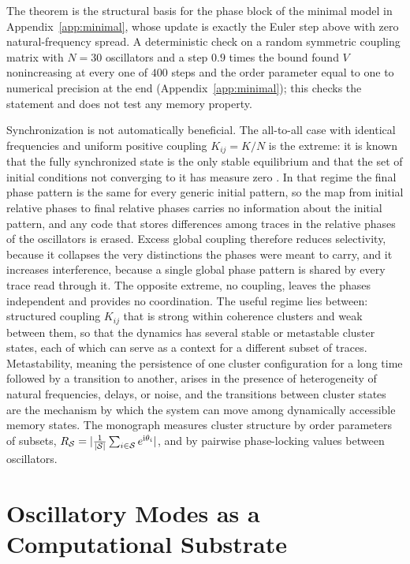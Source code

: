 The theorem is the structural basis for the phase block of the minimal model in Appendix~\ref{app:minimal}, whose update is exactly the Euler step above with zero natural-frequency spread. A deterministic check on a random symmetric coupling matrix with $N=30$ oscillators and a step $0.9$ times the bound found $V$ nonincreasing at every one of $400$ steps and the order parameter equal to one to numerical precision at the end (Appendix~\ref{app:minimal}); this checks the statement and does not test any memory property.

Synchronization is not automatically beneficial. The all-to-all case with identical frequencies and uniform positive coupling $K_{ij}=K/N$ is the extreme: it is known that the fully synchronized state is the only stable equilibrium and that the set of initial conditions not converging to it has measure zero \cite{kuramoto1984,strogatz2000,acebron2005,watanabe1994}. In that regime the final phase pattern is the same for every generic initial pattern, so the map from initial relative phases to final relative phases carries no information about the initial pattern, and any code that stores differences among traces in the relative phases of the oscillators is erased. Excess global coupling therefore reduces selectivity, because it collapses the very distinctions the phases were meant to carry, and it increases interference, because a single global phase pattern is shared by every trace read through it. The opposite extreme, no coupling, leaves the phases independent and provides no coordination. The useful regime lies between: structured coupling $K_{ij}$ that is strong within coherence clusters and weak between them, so that the dynamics has several stable or metastable cluster states, each of which can serve as a context for a different subset of traces. Metastability, meaning the persistence of one cluster configuration for a long time followed by a transition to another, arises in the presence of heterogeneity of natural frequencies, delays, or noise, and the transitions between cluster states are the mechanism by which the system can move among dynamically accessible memory states. The monograph measures cluster structure by order parameters of subsets, $R_{\mathcal S}=|\frac1{|\mathcal S|}\sum_{i\in\mathcal S}e^{\mathrm{i}\theta_i}|$, and by pairwise phase-locking values between oscillators.

\chapter{Oscillatory Modes as a Computational Substrate}\label{ch:cgl}

